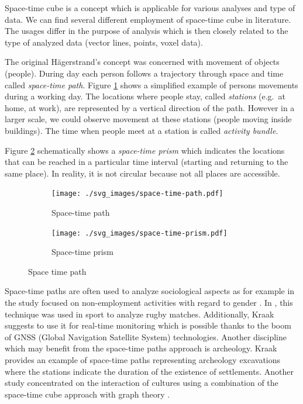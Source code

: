 \documentclass[a4paper,12pt]{book}
\begin{document}
Space-time cube is a concept which is applicable for various analyses and type of data.
We can find several different employment of space-time cube in literature.
The usages differ in the purpose of analysis which is then closely related
to the type of analyzed data (vector lines, points, voxel data).

The original Hägerstrand's concept was concerned with movement of objects (people).
During day each person follows a trajectory through space and time called
\emph{space-time path}. Figure \ref{fig:st-path} shows a simplified example
of persons movements during a working day. The locations where people stay,
called \emph{stations} (e.g.\ at home, at work), are represented by a vertical direction of the path.
However in a larger scale, we could observe movement at these stations
(people moving inside buildings). The time when people meet at a station is called \emph{activity bundle}.

Figure \ref{fig:st-prism} schematically shows a \emph{space-time prism}
which indicates the locations that can be reached in a particular time interval
(starting and returning to the same place). In reality, it is not circular because
not all places are accessible.




\begin{figure}[ht]
\centering
    \begin{subfigure}[ht]{0.49\textwidth}
    \centering
        \texttt{[image: ./svg\_images/space-time-path.pdf]}
    \caption{Space-time path}
    \label{fig:st-path}
    \end{subfigure}
    \begin{subfigure}[ht]{0.49\textwidth}
    \centering
        \texttt{[image: ./svg\_images/space-time-prism.pdf]}
    \caption{Space-time prism}
    \label{fig:st-prism}
    \end{subfigure}
\caption{Space time path}
\label{fig:st-path-prism}
\end{figure}

Space-time paths are often used to analyze sociological aspects
as for example in the study focused on non-employment activities with regard to gender \cite{kwan1999gender}.
In \cite{moore2003time}, this technique was used in sport to analyze rugby matches.
Additionally, Kraak \cite{kraak2005visualization} suggests to use it for real-time monitoring which is possible thanks to 
the boom of GNSS (Global Navigation Satellite System) technologies.
Another discipline which may benefit from the space-time paths approach is archeology.
Kraak \cite{kraak2005visualization} provides an example of space-time paths representing
archeology excavations where the stations indicate the duration of the existence of settlements.
Another study concentrated on the interaction of cultures using a combination of the space-time cube approach
with graph theory \cite{huisman2008development}.
\end{document}
